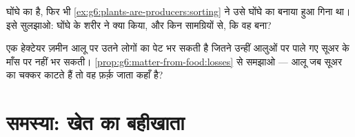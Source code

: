 \begin{exercise}[$\star\star$]\label{exo:g6:matter-from-food:11}
घोंघे का   है, फिर भी
\cref{ex:g6:plants-are-producers:sorting} ने उसे घोंघे का बनाया हुआ
गिना था। इसे सुलझाओ: घोंघे के शरीर ने क्या किया, और किन सामग्रियों से,
कि वह बना?
\end{exercise}

\begin{exercise}[$\star\star\star$]\label{exo:g6:matter-from-food:12}
एक हेक्टेयर ज़मीन आलू पर उतने लोगों का पेट भर सकती है जितने उन्हीं आलुओं
पर पाले गए सूअर के माँस पर नहीं भर सकती।
\cref{prop:g6:matter-from-food:losses} से समझाओ --- आलू जब सूअर का
चक्कर काटते हैं तो वह फ़र्क़ जाता कहाँ है?
\end{exercise}

\section{समस्या: खेत का बहीखाता}

